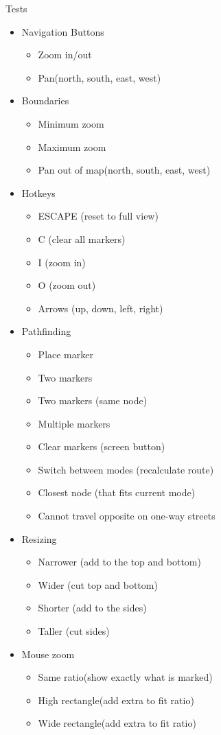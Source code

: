 Tests
\begin{itemize}
  \item Navigation Buttons
  \begin{itemize}
   \item Zoom in/out
   \item Pan(north, south, east, west)
   \end{itemize}
  \item Boundaries 
  \begin{itemize}
    \item Minimum zoom
    \item Maximum zoom
    \item Pan out of map(north, south, east, west) 
   \end{itemize}
  \item Hotkeys
  \begin{itemize}
   \item ESCAPE (reset to full view)
   \item C (clear all markers)
   \item I (zoom in)
   \item O (zoom out)
   \item Arrows (up, down, left, right)
  \end{itemize}
  \item Pathfinding 
  \begin{itemize}
   \item Place marker
   \item Two markers
   \item Two markers (same node)
   \item Multiple markers
   \item Clear markers (screen button)
   \item Switch between modes (recalculate route)
   \item Closest node (that fits current mode)
   \item Cannot travel opposite on one-way streets
  \end{itemize}
  \item Resizing 
  \begin{itemize}
   \item Narrower (add to the top and bottom)
   \item Wider (cut top and bottom)
   \item Shorter (add to the sides)
   \item Taller (cut sides)
  \end{itemize}
  \item Mouse zoom 
  \begin{itemize}
   \item Same ratio(show exactly what is marked)
   \item High rectangle(add extra to fit ratio)
   \item Wide rectangle(add extra to fit ratio)
  \end{itemize}
\end{itemize}
